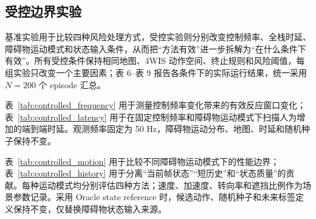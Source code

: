 \documentclass[UTF8,10pt,a4paper,twocolumn]{ctexart}
\begin{document}
\fi

\subsection{受控边界实验}

基准实验用于比较四种风险处理方式，受控实验则分别改变控制频率、全栈时延、障碍物运动模式和状态输入条件，从而把“方法有效”进一步拆解为“在什么条件下有效”。所有受控条件保持相同地图、4WIS 动作空间、终止规则和风险阈值，每组实验只改变一个主要因素；表 6--表 9 报告各条件下的实际运行结果，统一采用 $N=200$ 个 episode 汇总。

表~\ref{tab:controlled_frequency} 用于测量控制频率变化带来的有效反应窗口变化；表~\ref{tab:controlled_latency} 用于在固定控制频率和障碍物运动模式下扫描人为增加的端到端时延。观测频率固定为 50 Hz，障碍物运动分布、地图、时延和随机种子保持不变。

表~\ref{tab:controlled_motion} 用于比较不同障碍物运动模式下的性能边界；表~\ref{tab:controlled_history} 用于分离“当前帧状态”“短历史”和“状态质量”的贡献。每种运动模式均分别评估四种方法；速度、加速度、转向率和遮挡比例作为场景参数记录。采用 Oracle state reference 时，候选动作、随机种子和未来标签定义保持不变，仅替换障碍物状态输入来源。
\end{document}
